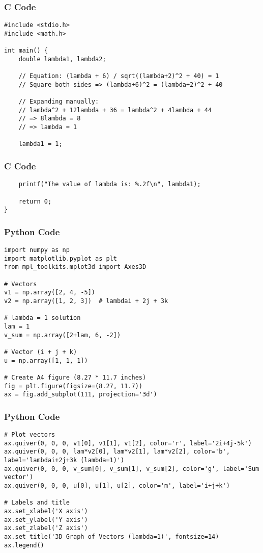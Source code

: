 \documentclass{beamer}
\begin{document}
\begin{frame}[fragile]
    \frametitle{C Code}
    \begin{lstlisting}
#include <stdio.h>
#include <math.h>

int main() {
    double lambda1, lambda2;

    // Equation: (lambda + 6) / sqrt((lambda+2)^2 + 40) = 1
    // Square both sides => (lambda+6)^2 = (lambda+2)^2 + 40

    // Expanding manually:
    // lambda^2 + 12lambda + 36 = lambda^2 + 4lambda + 44
    // => 8lambda = 8
    // => lambda = 1

    lambda1 = 1;
     \end{lstlisting}
\end{frame}
\begin{frame}[fragile]
    \frametitle{C Code }
    \begin{lstlisting}
    printf("The value of lambda is: %.2f\n", lambda1);

    return 0;
}

    \end{lstlisting}
\end{frame}
\begin{frame}[fragile]
    \frametitle{Python Code}
    \begin{lstlisting}
import numpy as np
import matplotlib.pyplot as plt
from mpl_toolkits.mplot3d import Axes3D

# Vectors
v1 = np.array([2, 4, -5])
v2 = np.array([1, 2, 3])  # lambdai + 2j + 3k

# lambda = 1 solution
lam = 1
v_sum = np.array([2+lam, 6, -2])

# Vector (i + j + k)
u = np.array([1, 1, 1])

# Create A4 figure (8.27 * 11.7 inches)
fig = plt.figure(figsize=(8.27, 11.7))
ax = fig.add_subplot(111, projection='3d')
    \end{lstlisting}
\end{frame}

\begin{frame}[fragile]
    \frametitle{Python Code}
    \begin{lstlisting}
# Plot vectors
ax.quiver(0, 0, 0, v1[0], v1[1], v1[2], color='r', label='2i+4j-5k')
ax.quiver(0, 0, 0, lam*v2[0], lam*v2[1], lam*v2[2], color='b', label='lambdai+2j+3k (lambda=1)')
ax.quiver(0, 0, 0, v_sum[0], v_sum[1], v_sum[2], color='g', label='Sum vector')
ax.quiver(0, 0, 0, u[0], u[1], u[2], color='m', label='i+j+k')

# Labels and title
ax.set_xlabel('X axis')
ax.set_ylabel('Y axis')
ax.set_zlabel('Z axis')
ax.set_title('3D Graph of Vectors (lambda=1)', fontsize=14)
ax.legend()
    \end{lstlisting}
\end{frame}
\end{document}
